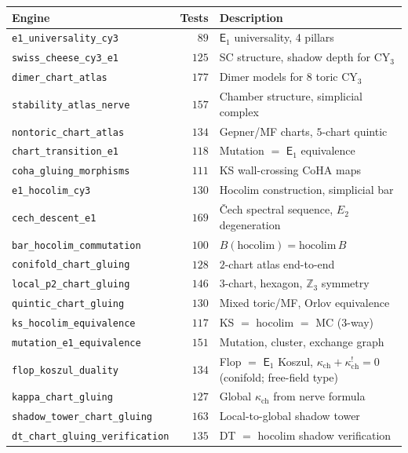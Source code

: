\documentclass[11pt]{article}
\newcommand{\Z}{\mathbb{Z}}
\newcommand{\Eone}{\mathsf{E}_1}
\begin{document}
\begin{center}
\small
\renewcommand{\arraystretch}{1.15}
\begin{longtable}{lr@{\quad}l}
 \toprule
 \textbf{Engine} & \textbf{Tests} & \textbf{Description} \\
 \midrule
 \texttt{e1\_universality\_cy3} & $89$ & $\Eone$ universality, 4 pillars \\
 \texttt{swiss\_cheese\_cy3\_e1} & $125$ & SC structure, shadow depth for CY$_3$ \\
 \texttt{dimer\_chart\_atlas} & $177$ & Dimer models for $8$ toric CY$_3$ \\
 \texttt{stability\_atlas\_nerve} & $157$ & Chamber structure, simplicial complex \\
 \texttt{nontoric\_chart\_atlas} & $134$ & Gepner/MF charts, $5$-chart quintic \\
 \texttt{chart\_transition\_e1} & $118$ & Mutation $=$ $\Eone$ equivalence \\
 \texttt{coha\_gluing\_morphisms} & $111$ & KS wall-crossing CoHA maps \\
 \texttt{e1\_hocolim\_cy3} & $130$ & Hocolim construction, simplicial bar \\
 \texttt{cech\_descent\_e1} & $169$ & \v{C}ech spectral sequence, $E_2$ degeneration \\
 \texttt{bar\_hocolim\_commutation} & $100$ & $B(\mathrm{hocolim}) = \mathrm{hocolim}\, B$ \\
 \texttt{conifold\_chart\_gluing} & $128$ & $2$-chart atlas end-to-end \\
 \texttt{local\_p2\_chart\_gluing} & $146$ & $3$-chart, hexagon, $\Z_3$ symmetry \\
 \texttt{quintic\_chart\_gluing} & $130$ & Mixed toric/MF, Orlov equivalence \\
 \texttt{ks\_hocolim\_equivalence} & $117$ & KS $=$ hocolim $=$ MC (3-way) \\
 \texttt{mutation\_e1\_equivalence} & $151$ & Mutation, cluster, exchange graph \\
 \texttt{flop\_koszul\_duality} & $134$ & Flop $=$ $\Eone$ Koszul, $\kappa_{\mathrm{ch}} + \kappa_{\mathrm{ch}}^! = 0$ (conifold; free-field type) \\
 \texttt{kappa\_chart\_gluing} & $127$ & Global $\kappa_{\mathrm{ch}}$ from nerve formula \\
 \texttt{shadow\_tower\_chart\_gluing} & $163$ & Local-to-global shadow tower \\
 \texttt{dt\_chart\_gluing\_verification} & $135$ & DT $=$ hocolim shadow verification \\

\end{longtable}
\end{center}
\end{document}
